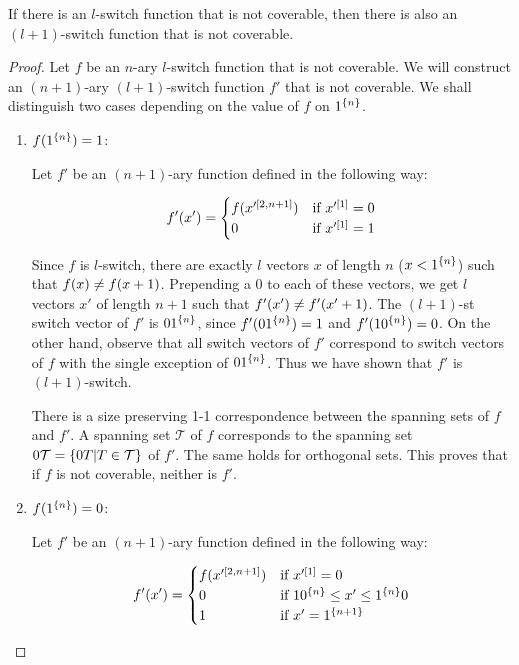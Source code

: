\begin{lemma}
\label{lemma:noncoverableinduction}
If there is an $l$-switch function that is not coverable,
then there is also an $(l+1)$-switch function
that is not coverable.
\end{lemma}

\begin{proof}
Let $f$ be an $n$-ary $l$-switch function
that is not coverable.
We will construct an $(n+1)$-ary $(l+1)$-switch function $f'$
that is not coverable.
We shall distinguish two cases depending on the value of $f$ on $1^{\{n\}}$.

\begin{enumerate}
\item $f (1^{\{n\}}) = 1$:

Let $f'$ be an $(n+1)$-ary function
defined in the following way:

\[
f' (x') =
\begin{cases}
f (x'^{[2, n+1]}) & \text{if } x'^{[1]} = 0 \\
0 & \text{if } x'^{[1]} = 1
\end{cases}
\]

Since $f$ is $l$-switch,
there are exactly $l$ vectors $x$ of length $n$
($x < 1^{\{n\}}$)
such that $f (x) \neq f (x+1)$.
Prepending a $0$ to each of these vectors,
we get $l$ vectors $x'$ of length $n+1$
such that $f' (x') \neq f' (x'+1)$.
The $(l+1)$-st switch vector of $f'$
is $0 1^{\{n\}}$,
since $f' (0 1^{\{n\}}) = 1$
and $f' (1 0^{\{n\}}) = 0$.
On the other hand,
observe that all switch vectors of $f'$
correspond to switch vectors of $f$
with the single exception of $0 1^{\{n\}}$.
Thus we have shown that $f'$ is $(l+1)$-switch.

There is
a size preserving
1-1 correspondence
between the spanning sets of $f$ and $f'$.
A spanning set $\mathcal{T}$ of $f$
corresponds to the spanning set
$0 \mathcal{T} = \{0 T | T \in \mathcal{T}\}$ of $f'$.
The same holds for orthogonal sets.
This proves that if $f$ is not coverable,
neither is $f'$.

\item $f (1^{\{n\}}) = 0$:

Let $f'$ be an $(n+1)$-ary function
defined in the following way:

$$
f' (x') =
\begin{cases}
f (x'^{[2, n+1]}) & \text{if } x'^{[1]} = 0 \\
0 & \text{if } 1 0^{\{n\}} \leq x' \leq 1^{\{n\}} 0 \\
1 & \text{if } x' = 1^{\{n+1\}}
\end{cases}
$$


\end{enumerate}
\end{proof}
